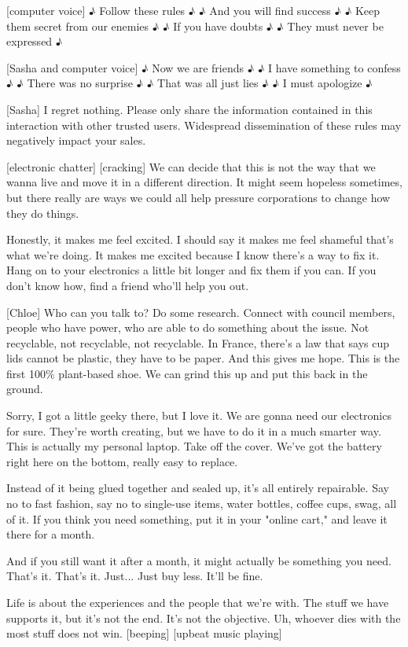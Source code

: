 \documentclass[a4paper]{article}
\begin{document}
	
	
	[computer voice] ♪ Follow these rules ♪
	♪ And you will find success ♪
	♪ Keep them secret from our enemies ♪
	♪ If you have doubts ♪
	♪ They must never be expressed ♪
	
	
	[Sasha and computer voice] ♪ Now we are friends ♪
	♪ I have something to confess ♪
	♪ There was no surprise ♪
	♪ That was all just lies ♪
	♪ I must apologize ♪
	
	
	
	[Sasha] I regret nothing.
	Please only share the information contained in this interaction with other trusted users.
	Widespread dissemination of these rules may negatively impact your sales.
	
	
	
	[electronic chatter]
	[cracking]
	We can decide that this is not the way that we wanna live and move it in a different direction.
	It might seem hopeless sometimes, but there really are ways we could all help pressure corporations to change how they do things.
	
	
	Honestly, it makes me feel excited.
	I should say it makes me feel shameful that's what we're doing.
	It makes me excited because I know there's a way to fix it.
	Hang on to your electronics a little bit longer and fix them if you can.
	If you don't know how, find a friend who'll help you out.
	
	
	[Chloe] Who can you talk to? Do some research.
	Connect with council members, people who have power, who are able to do something about the issue.
	Not recyclable, not recyclable, not recyclable.
	In France, there's a law that says cup lids cannot be plastic, they have to be paper.
	And this gives me hope.
	This is the first 100\% plant-based shoe.
	We can grind this up and put this back in the ground.
	
	
	
	Sorry, I got a little geeky there, but I love it.
	We are gonna need our electronics for sure.
	They're worth creating, but we have to do it in a much smarter way.
	This is actually my personal laptop.
	Take off the cover.
	We've got the battery right here on the bottom, really easy to replace.
	
	
	Instead of it being glued together and sealed up, it's all entirely repairable.
	Say no to fast fashion, say no to single-use items, water bottles, coffee cups, swag, all of it.
	If you think you need something, put it in your "online cart," and leave it there for a month.
	
	
	And if you still want it after a month, it might actually be something you need.
	That's it. That's it. Just... Just buy less.
	It'll be fine.
	
	
	
	Life is about the experiences and the people that we're with.
	The stuff we have supports it, but it's not the end.
	It's not the objective.
	Uh, whoever dies with the most stuff does not win.
	[beeping]
	[upbeat music playing]
	
	

	
\end{document}
